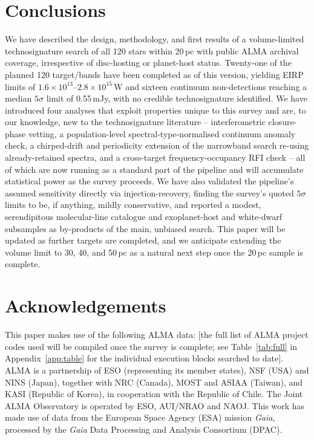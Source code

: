 \documentclass{openjournal}
\begin{document}
\section{Conclusions}
\label{sec:conclusions}

We have described the design, methodology, and first results of a
volume-limited technosignature search of all 120 stars within 20\,pc
with public ALMA archival coverage, irrespective of disc-hosting or
planet-host status. Twenty-one of the planned 120 target/bands have been
completed as of this version, yielding EIRP limits of
$1.6\times10^{13}$--$2.8\times10^{15}$\,W and sixteen continuum
non-detections reaching a median $5\sigma$ limit of 0.55\,mJy, with no
credible technosignature identified. We have introduced four analyses
that exploit properties unique to this survey and are, to our knowledge,
new to the technosignature literature -- interferometric closure-phase
vetting, a population-level spectral-type-normalised continuum anomaly
check, a chirped-drift and periodicity extension of the narrowband
search re-using already-retained spectra, and a cross-target
frequency-occupancy RFI check -- all of which are now running as a
standard part of the pipeline and will accumulate statistical power as
the survey proceeds. We have also validated the pipeline's assumed
sensitivity directly via injection-recovery, finding the survey's
quoted $5\sigma$ limits to be, if anything, mildly conservative, and
reported a modest, serendipitous molecular-line catalogue and
exoplanet-host and white-dwarf subsamples as by-products of the main,
unbiased search. This paper will be updated as further targets are
completed, and we anticipate extending the volume limit to 30, 40, and
50\,pc as a natural next step once the 20\,pc sample is complete.

\section*{Acknowledgements}
This paper makes use of the following ALMA data: [the full list of ALMA
project codes used will be compiled once the survey is complete; see
Table~\ref{tab:full} in Appendix~\ref{app:table} for the individual
execution blocks searched to date]. ALMA is a partnership of ESO
(representing its member states), NSF (USA) and NINS (Japan), together with NRC
(Canada), MOST and ASIAA (Taiwan), and KASI (Republic of Korea), in cooperation
with the Republic of Chile. The Joint ALMA Observatory is operated by ESO,
AUI/NRAO and NAOJ. This work has made use of data from the European Space
Agency (ESA) mission {\it Gaia}, processed by the {\it Gaia} Data Processing and
Analysis Consortium (DPAC).
\end{document}
